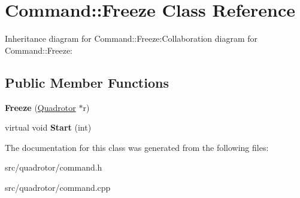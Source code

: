 \hypertarget{classCommand_1_1Freeze}{
\section{Command::Freeze Class Reference}
\label{classCommand_1_1Freeze}
}
Inheritance diagram for Command::Freeze:Collaboration diagram for Command::Freeze:\subsection*{Public Member Functions}
\begin{DoxyCompactItemize}
\item 
\hypertarget{classCommand_1_1Freeze_aec86b6e382bba9633b4eb7f965080265}{
{\bfseries Freeze} (\hyperlink{classQuadrotor}{Quadrotor} $\ast$r)}
\label{classCommand_1_1Freeze_aec86b6e382bba9633b4eb7f965080265}

\item 
\hypertarget{classCommand_1_1Freeze_a2903673ebb811dc5b18177d9b0ac174a}{
virtual void {\bfseries Start} (int)}
\label{classCommand_1_1Freeze_a2903673ebb811dc5b18177d9b0ac174a}

\end{DoxyCompactItemize}


The documentation for this class was generated from the following files:\begin{DoxyCompactItemize}
\item 
src/quadrotor/command.h\item 
src/quadrotor/command.cpp\end{DoxyCompactItemize}
